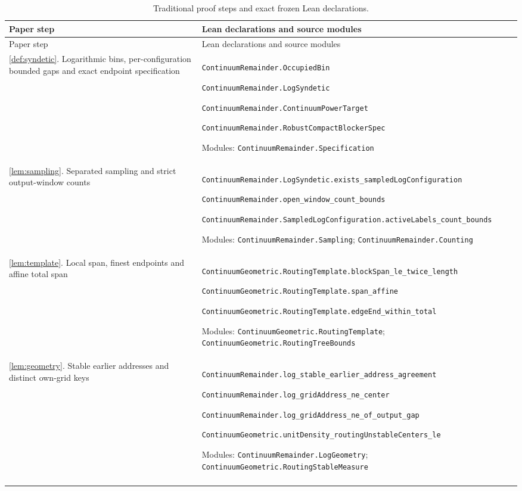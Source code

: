 \small
\begin{longtable}{@{}p{}p{}@{}}
\caption{Traditional proof steps and exact frozen Lean declarations.}\label{tab:correspondence}\\
\toprule Paper step & Lean declarations and source modules \\
\midrule\endfirsthead
\toprule Paper step & Lean declarations and source modules \\
\midrule\endhead
\bottomrule\endfoot
\ref{def:syndetic}. Logarithmic bins, per-configuration bounded gaps and exact endpoint specification & \nolinkurl{ContinuumRemainder.OccupiedBin}\par \nolinkurl{ContinuumRemainder.LogSyndetic}\par \nolinkurl{ContinuumRemainder.ContinuumPowerTarget}\par \nolinkurl{ContinuumRemainder.RobustCompactBlockerSpec}\par\smallskip Modules: \nolinkurl{ContinuumRemainder.Specification} \\\addlinespace
\ref{lem:sampling}. Separated sampling and strict output-window counts & \nolinkurl{ContinuumRemainder.LogSyndetic.exists_sampledLogConfiguration}\par \nolinkurl{ContinuumRemainder.open_window_count_bounds}\par \nolinkurl{ContinuumRemainder.SampledLogConfiguration.activeLabels_count_bounds}\par\smallskip Modules: \nolinkurl{ContinuumRemainder.Sampling}; \nolinkurl{ContinuumRemainder.Counting} \\\addlinespace
\ref{lem:template}. Local span, finest endpoints and affine total span & \nolinkurl{ContinuumGeometric.RoutingTemplate.blockSpan_le_twice_length}\par \nolinkurl{ContinuumGeometric.RoutingTemplate.span_affine}\par \nolinkurl{ContinuumGeometric.RoutingTemplate.edgeEnd_within_total}\par\smallskip Modules: \nolinkurl{ContinuumGeometric.RoutingTemplate}; \nolinkurl{ContinuumGeometric.RoutingTreeBounds} \\\addlinespace
\ref{lem:geometry}. Stable earlier addresses and distinct own-grid keys & \nolinkurl{ContinuumRemainder.log_stable_earlier_address_agreement}\par \nolinkurl{ContinuumRemainder.log_gridAddress_ne_center}\par \nolinkurl{ContinuumRemainder.log_gridAddress_ne_of_output_gap}\par \nolinkurl{ContinuumGeometric.unitDensity_routingUnstableCenters_le}\par\smallskip Modules: \nolinkurl{ContinuumRemainder.LogGeometry}; \nolinkurl{ContinuumGeometric.RoutingStableMeasure} \\\addlinespace

\end{longtable}

